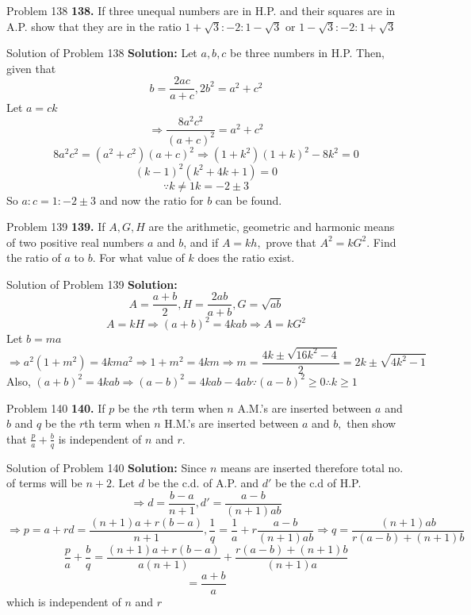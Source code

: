 \documentclass[aspectratio=1610,8pt]{beamer}
\begin{document}
\begin{frame}{Problem 138}
  \textbf{138.} If three unequal numbers are in H.P. and their squares are in A.P. show that they are in the ratio $1 +
  \sqrt{3}:-2:1 - \sqrt{3}$ or $1 - \sqrt{3}:-2:1 + \sqrt{3}$
\end{frame}
\begin{frame}{Solution of Problem 138}
  \textbf{Solution:} Let $a, b, c$ be three numbers in H.P. Then, given that
  $$b = \frac{2ac}{a + c}, 2b^2 = a^2 + c^2$$
  Let $a = ck$
  $$\Rightarrow \frac{8a^2c^2}{(a + c)^2} = a^2 + c^2$$
  $$8a^2c^2 = (a^2 + c^2)(a + c)^2\Rightarrow (1 + k^2)(1 + k)^2 - 8k^2 = 0$$
  $$(k - 1)^2(k^2 + 4k + 1) = 0$$
  $$\because k\neq 1 k = -2\pm 3$$
  So $a:c = 1:-2\pm 3$ and now the ratio for $b$ can be found.
\end{frame}
\begin{frame}{Problem 139}
  \textbf{139.} If $A, G, H$ are the arithmetic, geometric and harmonic means of two positive real numbers $a$ and $b$, and if $A =
  kh,$ prove that $A^2 = kG^2.$ Find the ratio of $a$ to $b.$ For what value of $k$ does the ratio exist.
\end{frame}
\begin{frame}{Solution of Problem 139}
  \textbf{Solution:} $$A = \frac{a + b}{2}, H=\frac{2ab}{a + b}, G = \sqrt{ab}$$
  $$A = kH\Rightarrow (a + b)^2 = 4kab \Rightarrow A = kG^2$$
  Let $b = ma$
  $$\Rightarrow a^2(1 + m^2) = 4kma^2 \Rightarrow 1 + m^2 = 4km \Rightarrow m = \frac{4k \pm \sqrt{16k^2 - 4}}{2} = 2k\pm
  \sqrt{4k^2 - 1}$$
  Also, $(a + b)^2 = 4kab \Rightarrow (a - b)^2 = 4kab - 4ab\because (a - b)^2 \geq 0 \therefore k \geq 1$
\end{frame}
\begin{frame}{Problem 140}
  \textbf{140.} If $p$ be the $r$th term when $n$ A.M.'s are inserted between $a$ and $b$ and $q$ be the $r$th term when $n$ H.M.'s
  are inserted between $a$ and $b,$ then show that $\frac{p}{a} + \frac{b}{q}$ is independent of $n$ and $r.$
\end{frame}
\begin{frame}{Solution of Problem 140}
  \textbf{Solution:} Since $n$ means are inserted therefore total no. of terms will be $n + 2.$ Let $d$ be the c.d. of A.P. and
  $d'$ be the c.d of H.P.
  $$\Rightarrow d = \frac{b - a}{n + 1}, d' = \frac{a - b}{(n + 1)ab}$$
  $$\Rightarrow p = a + rd = \frac{(n + 1)a + r(b - a)}{n + 1}, \frac{1}{q} = \frac{1}{a} + r\frac{a - b}{(n + 1)ab} \Rightarrow q =
  \frac{(n + 1)ab}{r(a - b) + (n + 1)b}$$
  $$\frac{p}{a} + \frac{b}{q} = \frac{(n + 1)a + r(b - a)}{a(n + 1)} + \frac{r(a - b) + (n + 1)b}{(n + 1)a}$$
  $$= \frac{a + b}{a}$$
  which is independent of $n$ and $r$
\end{frame}
\end{document}
